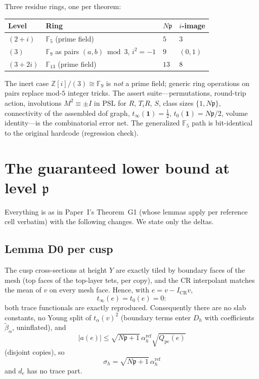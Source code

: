 \documentclass[11pt]{amsart}
\newcommand{\ZZ}{\mathbb{Z}}
\newcommand{\PSL}{\mathrm{PSL}}
\newcommand{\p}{\mathfrak{p}}
\begin{document}
Three residue rings, one per theorem:

\begin{center}
\begin{tabular}{@{}llll@{}}
\toprule
Level & Ring & $N\p$ & $i$-image \\
\midrule
$(2+i)$ & $\mathbb{F}_5$ (prime field) & $5$ & $3$ \\
$(3)$ & $\mathbb{F}_9$ as pairs $(a,b)\bmod 3$, $i^2=-1$
  & $9$ & $(0,1)$ \\
$(3+2i)$ & $\mathbb{F}_{13}$ (prime field) & $13$ & $8$ \\
\bottomrule
\end{tabular}
\end{center}

The inert case $\ZZ[i]/(3)\cong\mathbb{F}_9$ is \emph{not} a prime field;
generic ring operations on pairs replace mod-$5$ integer tricks.  The
assert suite---permutations, round-trip action, involutions
$M^2\equiv\pm I$ in $\PSL$ for $R$, $T_i R$, $S$, class sizes
$\{1,N\p\}$, connectivity of the assembled dof graph,
$t_\infty(\mathbf{1})=\tfrac12$, $t_0(\mathbf{1})=N\p/2$, volume
identity---is the combinatorial error net.  The generalized $\mathbb{F}_5$
path is bit-identical to the original hardcode (regression check).

\section{The guaranteed lower bound at level $\p$}\label{sec:G1p}

Everything is as in Paper~I's Theorem~G1 (whose lemmas apply per
reference cell verbatim) with the following changes.  We state only the
deltas.

\subsection{Lemma D0 per cusp}

The cusp cross-sections at height $Y$ are exactly tiled by boundary faces
of the mesh (top faces of the top-layer tets, per copy), and the CR
interpolant matches the mean of $v$ on every mesh face.  Hence, with
$e=v-I_{\mathrm{CR}}v$,
\[
  t_\infty(e)=t_0(e)=0:
\]
both trace functionals are exactly reproduced.  Consequently there are
no slab constants, no Young split of $t_\alpha(v)^2$ (boundary terms enter
$D_h$ with coefficients $\tilde\beta_\alpha$, uninflated), and
\[
  |a(e)|\le\sqrt{N\p+1}\,\alpha_h^{\mathrm{ref}}\sqrt{Q_{\mathrm{pc}}(e)}
\]
(disjoint copies), so
\[
  \sigma_h=\sqrt{N\p+1}\,\alpha_h^{\mathrm{ref}}
\]
and $d_e$ has no trace part.
\end{document}
